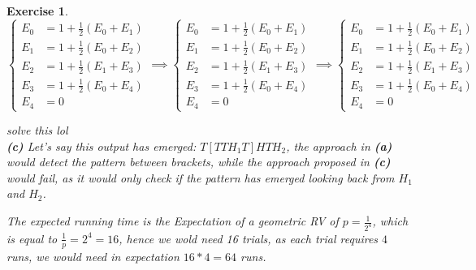 \documentclass{article}
\newtheorem{exo}{Exercise}
\begin{document}
\begin{exo}{\ \\}
$
\begin{cases}
    E_0 &= 1 + \frac{1}{2} \left( E_0 + E_1 \right) \\
    E_1 &= 1 +  \frac{1}{2} \left( E_0 + E_2 \right) \\
    E_2 &= 1 +  \frac{1}{2} \left( E_1 + E_3 \right) \\
    E_3 &= 1 +  \frac{1}{2} \left( E_0 + E_4 \right) \\
    E_4 &= 0
\end{cases} 
\implies 
\begin{cases}
    E_0 &= 1 + \frac{1}{2} \left( E_0 + E_1 \right) \\
    E_1 &= 1 +  \frac{1}{2} \left( E_0 + E_2 \right) \\
    E_2 &= 1 +  \frac{1}{2} \left( E_1 + E_3 \right) \\
    E_3 &= 1 +  \frac{1}{2} \left( E_0 + E_4 \right) \\
    E_4 &= 0
\end{cases}
\implies
\begin{cases}
    E_0 &= 1 + \frac{1}{2} \left( E_0 + E_1 \right) \\
    E_1 &= 1 +  \frac{1}{2} \left( E_0 + E_2 \right) \\
    E_2 &= 1 +  \frac{1}{2} \left( E_1 + E_3 \right) \\
    E_3 &= 1 +  \frac{1}{2} \left( E_0 + E_4 \right) \\
    E_4 &= 0
\end{cases}
$ 

solve this lol \\


\noindent
\textbf{(c)} Let's say this output has emerged: $T[TTH_1T]HTH_2$, the approach in \textbf{(a)} would detect the pattern between brackets, while the approach proposed in \textbf{(c)} would fail, as it would only check if the pattern has emerged looking back from $H_1$ and $H_2$. 

The expected running time is the Expectation of a geometric RV of  $p = \frac{1}{2^4}$, which is equal to $\frac{1}{p}= 2^4 = 16 $, hence we wold need 16 trials, as each trial requires $4$ runs, we would need in expectation $16*4 = 64$ runs.







\end{exo}
\end{document}
